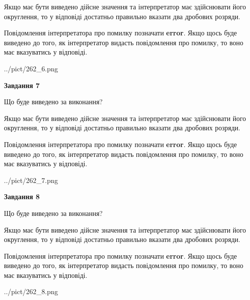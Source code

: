 \documentclass[12pt, ukrainian]{article}
\begin{document}
{\begin {Large}
Якщо має бути виведено дійсне значення та інтерпретатор має здійснювати його округлення, 
то у відповіді достатньо правильно вказати два дробових розряди.

Повідомлення інтерпретатора про помилку позначати \textbf{error}.
Якщо щось буде виведено до того, як інтерпретатор видасть повідомлення про помилку, 
то воно має вказуватись у відповіді. \par

\begin{center}
	{../pict/262_6.png}
\end{center}
\newpage

{\begin {center}\textbf{Завдання 7}\end {center}}\par
Що буде виведено за виконання? \par

Якщо має бути виведено дійсне значення та інтерпретатор має здійснювати його округлення, 
то у відповіді достатньо правильно вказати два дробових розряди.

Повідомлення інтерпретатора про помилку позначати \textbf{error}.
Якщо щось буде виведено до того, як інтерпретатор видасть повідомлення про помилку, 
то воно має вказуватись у відповіді. \par

\begin{center}
	{../pict/262_7.png}
\end{center}
\newpage

{\begin {center}\textbf{Завдання 8}\end {center}}\par
Що буде виведено за виконання? \par

Якщо має бути виведено дійсне значення та інтерпретатор має здійснювати його округлення, 
то у відповіді достатньо правильно вказати два дробових розряди.

Повідомлення інтерпретатора про помилку позначати \textbf{error}.
Якщо щось буде виведено до того, як інтерпретатор видасть повідомлення про помилку, 
то воно має вказуватись у відповіді. \par

\begin{center}
	{../pict/262_8.png}
\end{center}
\newpage


\end{Large}}
\end{document}
